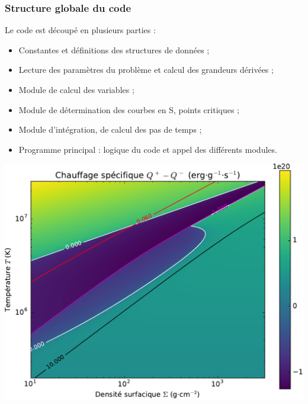 \documentclass[french]{beamer}
\begin{document}


\begin{frame}
    \frametitle{Structure globale du code}
    Le code est découpé en plusieurs parties :
    \begin{itemize}
        \item Constantes et définitions des structures de données ;
        \item Lecture des paramètres du problème et calcul des grandeurs dérivées ;
        \item Module de calcul des variables ;
        \item Module de détermination des courbes en S, points critiques ;
        \item Module d’intégration, de calcul des pas de temps ;
        \item Programme principal : logique du code et appel des différents modules.
    \end{itemize}
\end{frame}

\begin{frame}
    \begin{algorithm}[H]
    \end{algorithm}
\end{frame}

\begin{frame}
    \includegraphics[width=\textwidth]{Qmap.pdf}
\end{frame}
\end{document}
